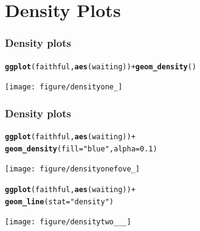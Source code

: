 \documentclass{beamer}\usepackage{graphicx, color}
\makeatletter
\newcommand{\hlfunctioncall}[1]{\textcolor[rgb]{0.501960784313725,0,0.329411764705882}{\textbf{#1}}}%
\newcommand{\hlstring}[1]{\textcolor[rgb]{0.6,0.6,1}{#1}}%
\newenvironment{kframe}{%
 \def\at@end@of@kframe{}%
 \ifinner\ifhmode%
  \def\at@end@of@kframe{\end{minipage}}%
  \begin{minipage}{\columnwidth}%
 \fi\fi%
 \def\FrameCommand##1{\hskip\@totalleftmargin \hskip-\fboxsep
 \colorbox{shadecolor}{##1}\hskip-\fboxsep
     \hskip-\linewidth \hskip-\@totalleftmargin \hskip\columnwidth}%
 \MakeFramed {\advance\hsize-\width
   \@totalleftmargin\z@ \linewidth\hsize
   \@setminipage}}%
 {\par\unskip\endMakeFramed%
 \at@end@of@kframe}
\newenvironment{knitrout}{}{} %
\makeatother
\begin{document}
\section*{Density Plots}
\frame{\sectionpage}

\begin{frame}[fragile]
\frametitle{Density plots}
\begin{knitrout}\footnotesize
{}\color{fgcolor}\begin{kframe}
\begin{alltt}
\hlfunctioncall{ggplot}(faithful, \hlfunctioncall{aes}(waiting)) + \hlfunctioncall{geom_density}()
\end{alltt}
\end{kframe}
\texttt{[image: figure/densityone\_]} 

\end{knitrout}

\end{frame}

\begin{frame}[fragile]
\frametitle{Density plots}
\begin{knitrout}\footnotesize
{}\color{fgcolor}\begin{kframe}
\begin{alltt}
\hlfunctioncall{ggplot}(faithful, \hlfunctioncall{aes}(waiting)) +
\hlfunctioncall{geom_density}(fill = \hlstring{"blue"}, alpha = 0.1)
\end{alltt}
\end{kframe}
\texttt{[image: figure/densityonefove\_]} 

\end{knitrout}

\end{frame}



\begin{frame}[fragile]
\begin{knitrout}\footnotesize
{}\color{fgcolor}\begin{kframe}
\begin{alltt}
\hlfunctioncall{ggplot}(faithful, \hlfunctioncall{aes}(waiting)) +
\hlfunctioncall{geom_line}(stat = \hlstring{"density"})
\end{alltt}
\end{kframe}
\texttt{[image: figure/densitytwo\_\_\_]} 

\end{knitrout}

\end{frame}
\end{document}
